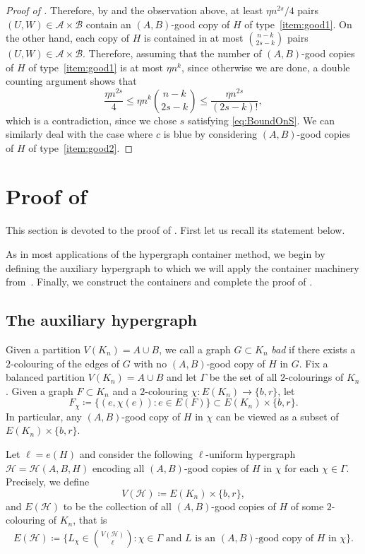 \documentclass[a4paper,reqno,11pt]{amsart}
\theoremstyle{definition}
\theoremstyle{remark}
\newcommand\cA{\mathcal{A}}
\newcommand\cB{\mathcal{B}}
\newcommand\cH{\mathcal{H}}
\renewcommand\le{\leqslant}
\renewcommand\to{\rightarrow}
\def\cA{\mathcal{A}}
\begin{document}
\begin{proof}[Proof of ]
Therefore, by  and the observation above, at least $\eta n^{2s}/4$ pairs $(U,W)\in \cA \times \cB$ contain an $(A,B)$-good copy of $H$ of type~\ref{item:good1}. 
On the other hand, each copy of $H$ is contained in at most $\binom{n-k}{2s-k}$ pairs $(U,W) \in \cA \times \cB$. Therefore, assuming that the number of $(A,B)$-good copies of $H$ of type~\ref{item:good1} is at most $\eta n^k$, since otherwise we are done, a double counting argument shows that
\[\frac{\eta n^{2s}}{4} \le \eta n^k \binom{n-k}{2s-k} \le \frac{\eta n^{2s}}{
(2s-k)!},\]
which is a contradiction, since we chose $s$ satisfying \eqref{eq:BoundOnS}. We can similarly deal with the case where $c$ is blue by considering $(A,B)$-good copies of $H$ of type~\ref{item:good2}.
\end{proof}

\section{Proof of }\label{sec:5}

This section is devoted to the proof of . First let us recall its statement below.

\ABcontainer*

As in most applications of the hypergraph container method, we begin by defining the auxiliary hypergraph to which we will apply the container machinery from~\cite{BMS,ST}. Finally, we construct the containers and complete the proof of .

\subsection{The auxiliary hypergraph}\label{subsec:AH} Given a partition $V(K_n)=A \cup B$, we call a graph $G \subset K_n$ \emph{bad} if there exists a $2$-colouring of the edges of $G$ with no $(A,B)$-good copy of $H$ in $G$. Fix a balanced partition $V(K_n)=A\cup B$ and let $\Gamma$ be the set of all $2$-colourings of $K_n$. Given a graph $F \subset K_n$ and a $2$-colouring $\chi\colon E(K_n) \to \{b,r\}$, let 
\[F_{\chi}\coloneqq\big\{(e,\chi(e)) \colon e \in E(F)\big\} \subset E(K_n)\times\{b,r\}.\]
In particular, any $(A,B)$-good copy of $H$ in $\chi$ can be viewed as a subset of $E(K_n)\times\{b,r\}$.

Let $\ell=e(H)$ and consider the following $\ell$-uniform hypergraph $\cH=\cH(A,B,H)$ encoding all $(A,B)$-good copies of $H$ in $\chi$ for each $\chi \in \Gamma$. Precisely, we define
\[V(\cH)\coloneqq E(K_n)\times\{b,r\},\] and $E(\cH)$ to be the collection of all $(A,B)$-good copies of $H$ of some $2$-colouring of $K_n$, that is
\begin{align*}
E(\cH)\coloneqq \Big\{
L_{\chi}\in\binom{V(\cH)}{\ell} \colon \chi\in \Gamma \text{ and } L\text{ is an }  (A,B)\text{-good copy of } H\text{ in }\chi   
\Big\}.   
\end{align*} 
\end{document}
